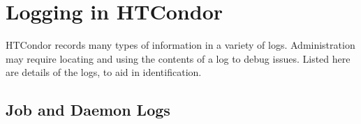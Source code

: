 \section{Logging in HTCondor}\label{sec:logging}
HTCondor records many types of information in a variety of logs.
Administration may require locating and using the
contents of a log to debug issues.
Listed here are details of the logs, to aid in identification.

\subsection{\label{sec:job-systemlogs}Job and Daemon Logs}
